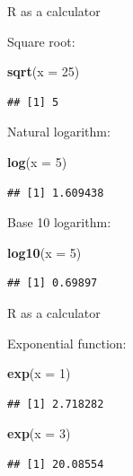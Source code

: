 \documentclass[ignorenonframetext,]{beamer}
\newenvironment{Shaded}{\begin{snugshade}}{\end{snugshade}}
\newcommand{\DataTypeTok}[1]{\textcolor[rgb]{0.13,0.29,0.53}{#1}}
\newcommand{\DecValTok}[1]{\textcolor[rgb]{0.00,0.00,0.81}{#1}}
\newcommand{\KeywordTok}[1]{\textcolor[rgb]{0.13,0.29,0.53}{\textbf{#1}}}
\newcommand{\NormalTok}[1]{#1}
\begin{document}
\begin{frame}[fragile]{R as a calculator}
\protect\hypertarget{r-as-a-calculator-2}{}

Square root:

\begin{Shaded}
\begin{Highlighting}[]
\KeywordTok{sqrt}\NormalTok{(}\DataTypeTok{x =} \DecValTok{25}\NormalTok{)}
\end{Highlighting}
\end{Shaded}

\begin{verbatim}
## [1] 5
\end{verbatim}

Natural logarithm:

\begin{Shaded}
\begin{Highlighting}[]
\KeywordTok{log}\NormalTok{(}\DataTypeTok{x =} \DecValTok{5}\NormalTok{)}
\end{Highlighting}
\end{Shaded}

\begin{verbatim}
## [1] 1.609438
\end{verbatim}

Base 10 logarithm:

\begin{Shaded}
\begin{Highlighting}[]
\KeywordTok{log10}\NormalTok{(}\DataTypeTok{x =} \DecValTok{5}\NormalTok{)}
\end{Highlighting}
\end{Shaded}

\begin{verbatim}
## [1] 0.69897
\end{verbatim}

\end{frame}

\begin{frame}[fragile]{R as a calculator}
\protect\hypertarget{r-as-a-calculator-3}{}

Exponential function:

\begin{Shaded}
\begin{Highlighting}[]
\KeywordTok{exp}\NormalTok{(}\DataTypeTok{x =} \DecValTok{1}\NormalTok{)}
\end{Highlighting}
\end{Shaded}

\begin{verbatim}
## [1] 2.718282
\end{verbatim}

\begin{Shaded}
\begin{Highlighting}[]
\KeywordTok{exp}\NormalTok{(}\DataTypeTok{x =} \DecValTok{3}\NormalTok{)}
\end{Highlighting}
\end{Shaded}

\begin{verbatim}
## [1] 20.08554
\end{verbatim}

\end{frame}
\end{document}
